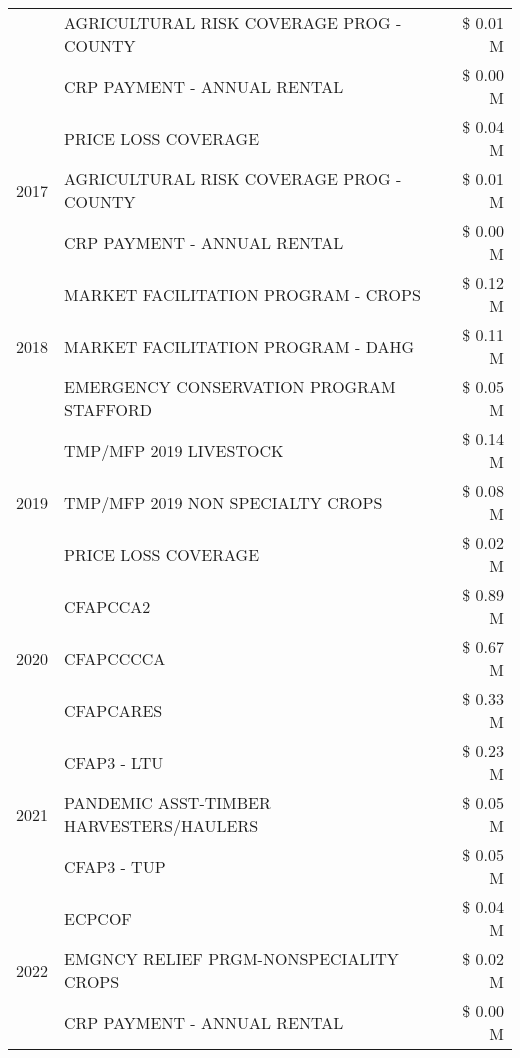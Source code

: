 \begin{tabular}{llr}
 & AGRICULTURAL RISK COVERAGE PROG - COUNTY & \$ 0.01 M \\
 & CRP PAYMENT - ANNUAL RENTAL & \$ 0.00 M \\
\cline{1-3}
\multirow[t]{3}{*}{2017} & PRICE LOSS COVERAGE & \$ 0.04 M \\
 & AGRICULTURAL RISK COVERAGE PROG - COUNTY & \$ 0.01 M \\
 & CRP PAYMENT - ANNUAL RENTAL & \$ 0.00 M \\
\cline{1-3}
\multirow[t]{3}{*}{2018} & MARKET FACILITATION PROGRAM - CROPS & \$ 0.12 M \\
 & MARKET FACILITATION PROGRAM - DAHG & \$ 0.11 M \\
 & EMERGENCY CONSERVATION PROGRAM STAFFORD & \$ 0.05 M \\
\cline{1-3}
\multirow[t]{3}{*}{2019} & TMP/MFP 2019 LIVESTOCK & \$ 0.14 M \\
 & TMP/MFP 2019 NON SPECIALTY CROPS & \$ 0.08 M \\
 & PRICE LOSS COVERAGE & \$ 0.02 M \\
\cline{1-3}
\multirow[t]{3}{*}{2020} & CFAPCCA2 & \$ 0.89 M \\
 & CFAPCCCCA & \$ 0.67 M \\
 & CFAPCARES & \$ 0.33 M \\
\cline{1-3}
\multirow[t]{3}{*}{2021} & CFAP3 - LTU & \$ 0.23 M \\
 & PANDEMIC ASST-TIMBER HARVESTERS/HAULERS & \$ 0.05 M \\
 & CFAP3 - TUP & \$ 0.05 M \\
\cline{1-3}
\multirow[t]{3}{*}{2022} & ECPCOF & \$ 0.04 M \\
 & EMGNCY RELIEF PRGM-NONSPECIALITY CROPS & \$ 0.02 M \\
 & CRP PAYMENT - ANNUAL RENTAL & \$ 0.00 M \\
\cline{1-3}
\bottomrule
\end{tabular}
